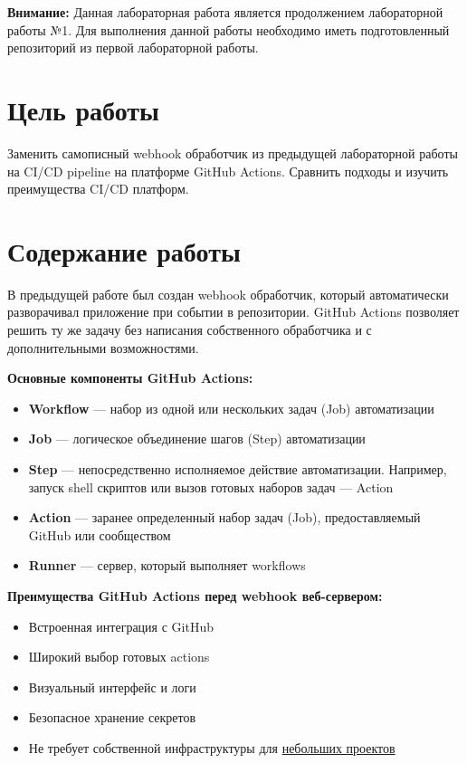 \documentclass[12pt,a4paper]{article}
\begin{document}
\makelabcover

\commoninstructions

\textbf{Внимание:} Данная лабораторная работа является продолжением лабораторной работы №1.
Для выполнения данной работы необходимо иметь подготовленный репозиторий из первой лабораторной работы.

\section{Цель работы}

Заменить самописный webhook обработчик из предыдущей лабораторной работы на CI/CD pipeline на платформе GitHub Actions.
Сравнить подходы и изучить преимущества CI/CD платформ.

\section{Содержание работы}

В предыдущей работе был создан webhook обработчик, который автоматически разворачивал приложение при событии в репозитории.
GitHub Actions позволяет решить ту же задачу без написания собственного обработчика и с дополнительными возможностями.

\vspace{0.5cm}
\textbf{Основные компоненты GitHub Actions:}
\begin{itemize}
    \item \textbf{Workflow} — набор из одной или нескольких задач (Job) автоматизации
    \item \textbf{Job} — логическое объединение шагов (Step) автоматизации
    \item \textbf{Step} — непосредственно исполняемое действие автоматизации.
    Например, запуск shell скриптов или вызов готовых наборов задач — Action
    \item \textbf{Action} — заранее определенный набор задач (Job), предоставляемый GitHub или сообществом
    \item \textbf{Runner} — сервер, который выполняет workflows
\end{itemize}

\vspace{0.5cm}
\textbf{Преимущества GitHub Actions перед webhook веб-сервером:}
\begin{itemize}
    \item Встроенная интеграция с GitHub
    \item Широкий выбор готовых actions
    \item Визуальный интерфейс и логи
    \item Безопасное хранение секретов
    \item Не требует собственной инфраструктуры для \href{https://docs.github.com/en/billing/concepts/product-billing/github-actions?versionId=free-pro-team%40latest&productId=actions&restPage=get-started%2Cunderstand-github-actions#free-use-of-github-actions}{небольших проектов}
\end{itemize}
\end{document}

